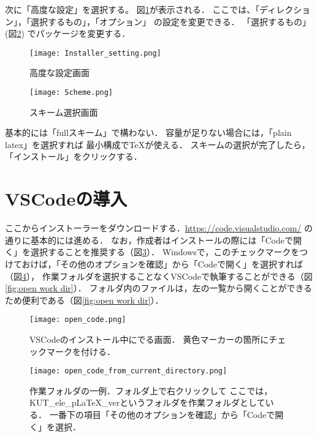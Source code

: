 次に「高度な設定」を選択する。
図\ref{fig:installer_setting}が表示される．
ここでは、「ディレクション」，「選択するもの」，「オプション」
の設定を変更できる．
「選択するもの」(図\ref{fig:scheme})
でパッケージを変更する．

\begin{figure}[H]
  \centering
  \texttt{[image: Installer\_setting.png]}
  \caption{高度な設定画面}
  \label{fig:installer_setting}
\end{figure}

\begin{figure}[H]
  \centering
  \texttt{[image: Scheme.png]}
  \caption{スキーム選択画面}
  \label{fig:scheme}
\end{figure}

基本的には「fullスキーム」で構わない．
容量が足りない場合には，「plain latex」を選択すれば
最小構成でTeXが使える．
スキームの選択が完了したら，「インストール」をクリックする．

\section{VSCodeの導入}
ここからインストーラーをダウンロードする．\url{https://code.visualstudio.com/}
\cite{Tex_bilud}の通りに基本的には進める．
なお，作成者はインストールの際には「Codeで開く」を選択することを推奨する（図\ref{fig:open code}）．
Windowsで，このチェックマークをつけておけば，「その他のオプションを確認」から「Codeで開く」を選択すれば（図\ref{fig:open code curr dir}），
作業フォルダを選択することなくVSCodeで執筆することができる（図\ref{fig:open work dir}）．
フォルダ内のファイルは，左の一覧から開くことができるため便利である（図\ref{fig:open work dir}）．

\begin{figure}[H]
  \centering
  \texttt{[image: open\_code.png]}
  \caption{
    VSCodeのインストール中にでる画面．
    黄色マーカーの箇所にチェックマークを付ける．
  }
  \label{fig:open code}
\end{figure}

\begin{figure}[tb]
  \centering
  \texttt{[image: open\_code\_from\_current\_directory.png]}
  \caption{
    作業フォルダの一例．フォルダ上で右クリックして
    ここでは，KUT\_ele\_pLaTeX\_verというフォルダを作業フォルダとしている．
    一番下の項目「その他のオプションを確認」から「Codeで開く」を選択．}
  \label{fig:open code curr dir}
\end{figure}

